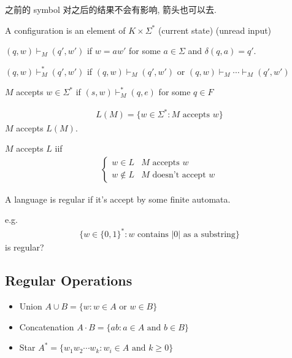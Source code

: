 之前的 symbol 对之后的结果不会有影响, 箭头也可以去. 

\begin{definition}[configuration]
    A configuration is an element of $K\times \Sigma^*$
    (current state) (unread input)
\end{definition}

\begin{definition}
    $(q,w)\vdash_M (q', w')$ if $w=aw'$ for some $a\in \Sigma$ and $\delta(q, a)=q'$. 
\end{definition}

\begin{definition}[yields]
    $(q,w)\vdash_M^* (q', w')$ if $(q,w)\vdash_M(q', w')$ or $(q,w)\vdash_M\cdots \vdash_M(q', w')$
\end{definition}


\begin{definition}
    $M$ accepts $w\in \Sigma^*$ if $(s,w)\vdash_M^*(q,e)$ for some $q\in F$
\end{definition}

\begin{definition}
    \begin{align*}
        L(M)=\{ w\in \Sigma^*: M\text{ accepts }w \}
    \end{align*}
    $M$ accepts $L(M)$. 
\end{definition}

$M$ accepts $L$ iif
\begin{align*}
    \left\{ \begin{array}{ll}
        w\in L & M\text{ accepts }w\\
        w\notin L & M\text{ doesn't accept }w
    \end{array} \right.
\end{align*}

\begin{definition}
    A language is regular if it's accept by some finite automata. 
\end{definition}

e.g. 
\begin{align*}
    \{ w\in\{ 0,1 \}^*: w \text{ contains $|0|$ as a substring}\}
\end{align*} is regular?

\subsection{Regular Operations}
\begin{definition}\quad

    \begin{itemize}
        \item Union $A\cup B=\{ w: w\in A \text{ or }w \in B \}$
        \item Concatenation $A\cdot B=\{ ab: a\in A\text{ and }b \in B \}$
        \item Star $A^*=\{ w_1 w_2\cdots w_k :w_i \in A\text{ and }k\ge 0 \}$
    \end{itemize}
\end{definition}

